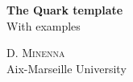 
\thispagestyle{empty}


$~$

\vfill

\begin{large}
\noindent \textbf{The Quark template} \\
\noindent With examples \\
\end{large}

\noindent \textsc{D. Minenna} \\

\noindent Aix-Marseille University



